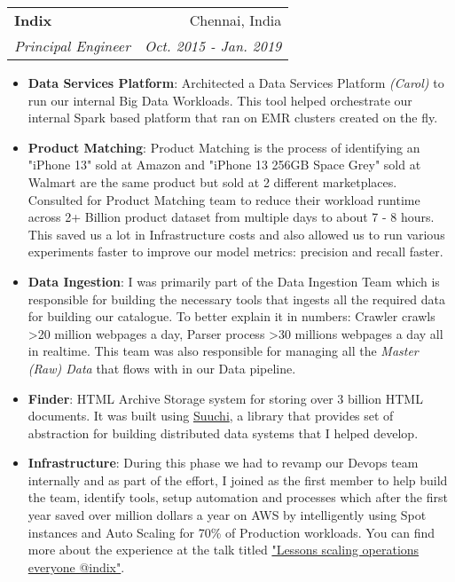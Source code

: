 \documentclass[letterpaper,11pt]{article}
\makeatletter
\newcommand{\resumeItem}[2]{
  \item\small{
    \textbf{#1}{: #2 \vspace{-2pt}}
  }
}
\newcommand{\resumeSubheading}[4]{
  \vspace{-1pt}\item
    \begin{tabular*}{0.97\textwidth}[t]{l@{\extracolsep{\fill}}r}
      \textbf{#1} & #2 \\
      \textit{\small#3} & \textit{\small #4} \\
    \end{tabular*}\vspace{-5pt}
}
\newcommand{\resumeItemListStart}{\begin{itemize}}
\newcommand{\resumeItemListEnd}{\end{itemize}\vspace{-5pt}}
\makeatother
\begin{document}
    \resumeSubheading
      {Indix}{Chennai, India}
      {Principal Engineer}{Oct. 2015 - Jan. 2019}
      \resumeItemListStart
        \resumeItem{Data Services Platform}
          {
            Architected a Data Services Platform \textit{(Carol)} to run our internal Big Data Workloads. This tool helped orchestrate our
            internal Spark based platform that ran on EMR clusters created on the fly.
          }
          \resumeItem{Product Matching}
          {
            Product Matching is the process of identifying an "iPhone 13" sold at Amazon and "iPhone 13 256GB Space Grey" sold at Walmart are the same product but sold at 2 different marketplaces. Consulted for Product Matching team to reduce their workload runtime across 2+ Billion product dataset from multiple days to about 7 - 8 hours. This saved us a lot in Infrastructure costs and also allowed us to run various experiments faster to improve our model metrics: precision and recall faster.
          }
          \resumeItem{Data Ingestion}
          {
            I was primarily part of the Data Ingestion Team which is responsible for building the necessary tools that ingests all the required data for building our catalogue. To better explain it in numbers: Crawler crawls >20 million webpages a day, Parser process >30 millions webpages a day all in realtime. This team was also responsible for managing all the \textit{Master (Raw) Data} that flows with in our Data pipeline.
          }
        \resumeItem{Finder}
          {
            HTML Archive Storage system for storing over 3 billion HTML documents. It was built using \href{https://github.com/ashwanthkumar/suuchi}{Suuchi}, a library that provides set of abstraction for building distributed data systems that I helped develop.
          }
          \resumeItem{Infrastructure}
          {
            During this phase we had to revamp our Devops team internally and as part of the effort, I joined as the first member to help build the team, identify tools, setup automation and processes which after the first year saved over million dollars a year on AWS by intelligently using Spot instances and Auto Scaling for 70\% of Production workloads.
            \newline
            You can find more about the experience at the talk titled \href{https://speakerdeck.com/ashwanthkumar/lessons-scaling-operations-to-everyone-at-indix}{"Lessons scaling operations everyone @indix"}.
          }
      \resumeItemListEnd
\end{document}

